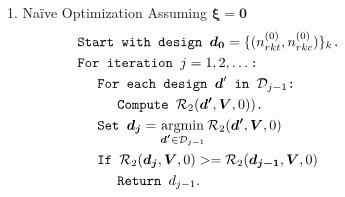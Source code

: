 \documentclass[usenames,dvipsnames]{beamer}
\newcommand{\bsxi}{\boldsymbol{\xi}}
\DeclareMathOperator*{\argmin}{argmin}
\theoremstyle{definition} %
\begin{document}
\begin{frame}[allowframebreaks]{1. Na\"ive Optimization Assuming $\bsxi \boldsymbol{= 0}$}
\small
\begin{equation}\label{eq:greedyAlg}
\begin{split}
& \texttt{Start with design $\boldsymbol{d_0} = \{ (n_{rkt}^{(0)}, n_{rkc}^{(0)})\}_k$.} \hspace{25mm} \\
& \texttt{For iteration $j = 1, 2, \dots$:}\\
& \hspace{5mm} \texttt{For each design $\boldsymbol d'$ in $\mathcal{D}_{j-1}$:}\\
& \hspace{10mm} \texttt{Compute $\mathcal{R}_2(\boldsymbol{d'}, \boldsymbol V, 0) )$. } \\
& \hspace{5mm} \texttt{Set $\boldsymbol{d_j} = \argmin_{\boldsymbol{d'} \in \mathcal{D}_{j - 1}} \mathcal{R}_2(\boldsymbol{d'}, \boldsymbol V, 0) $} \\
& \hspace{5mm} \texttt{If $\mathcal{R}_2(\boldsymbol{d_j}, \boldsymbol V, 0)  >=  \mathcal{R}_2(\boldsymbol{d_{j-1}}, \boldsymbol V, 0) $}\\
& \hspace{10mm} \texttt{Return $d_{j - 1}.$}\\
\end{split}
\end{equation}
\end{frame}
\end{document}
